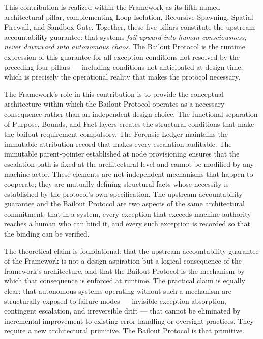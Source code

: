 This contribution is realized within the \bxthree{} Framework as its fifth named architectural pillar, complementing Loop Isolation, Recursive Spawning, Spatial Firewall, and Sandbox Gate. Together, these five pillars constitute the upstream accountability guarantee: that \bxthree{} systems \emph{fail upward into human consciousness, never downward into autonomous chaos}. The Bailout Protocol is the runtime expression of this guarantee for all exception conditions not resolved by the preceding four pillars --- including conditions not anticipated at design time, which is precisely the operational reality that makes the protocol necessary.

The \bxthree{} Framework's role in this contribution is to provide the conceptual architecture within which the Bailout Protocol operates as a necessary consequence rather than an independent design choice. The functional separation of Purpose, Bounds, and Fact layers creates the structural conditions that make the bailout requirement compulsory. The Forensic Ledger maintains the immutable attribution record that makes every escalation auditable. The immutable parent-pointer established at node provisioning ensures that the escalation path is fixed at the architectural level and cannot be modified by any machine actor. These elements are not independent mechanisms that happen to cooperate; they are mutually defining structural facts whose necessity is established by the protocol's own specification. The upstream accountability guarantee and the Bailout Protocol are two aspects of the same architectural commitment: that in a \bxthree{} system, every exception that exceeds machine authority reaches a human who can bind it, and every such exception is recorded so that the binding can be verified.

The theoretical claim is foundational: that the upstream accountability guarantee of the \bxthree{} Framework is not a design aspiration but a logical consequence of the framework's architecture, and that the Bailout Protocol is the mechanism by which that consequence is enforced at runtime. The practical claim is equally clear: that autonomous systems operating without such a mechanism are structurally exposed to failure modes --- invisible exception absorption, contingent escalation, and irreversible drift --- that cannot be eliminated by incremental improvement to existing error-handling or oversight practices. They require a new architectural primitive. The Bailout Protocol is that primitive.

